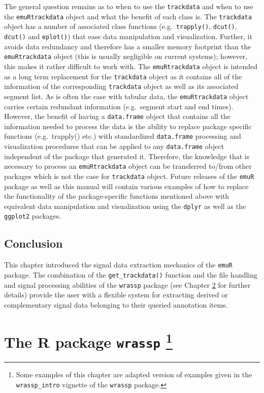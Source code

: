 \documentclass[]{book}
\let\rmarkdownfootnote\footnote%
\def\footnote{\protect\rmarkdownfootnote}
\begin{document}
The general question remains as to when to use the \texttt{trackdata} and when to use the \texttt{emuRtrackdata} object and what the benefit of each class is. The \texttt{trackdata} object has a number of associated class functions (e.g.~\texttt{trapply()}, \texttt{dcut()}, \texttt{dcut()} and \texttt{eplot()}) that ease data manipulation and visualization. Further, it avoids data redundancy and therefore has a smaller memory footprint than the \texttt{emuRtrackdata} object (this is usually negligible on current systems); however, this makes it rather difficult to work with. The \texttt{emuRtrackdata} object is intended as a long term replacement for the \texttt{trackdata} object as it contains all of the information of the corresponding \texttt{trackdata} object as well as its associated segment list. As is often the case with tabular data, the \texttt{emuRtrackdata} object carries certain redundant information (e.g.~segment start and end times). However, the benefit of having a \texttt{data.frame} object that contains all the information needed to process the data is the ability to replace package specific functions (e.g.~trapply() etc.) with standardized \texttt{data.frame} processing and visualization procedures that can be applied to any \texttt{data.frame} object independent of the package that generated it. Therefore, the knowledge that is necessary to process an \texttt{emuRtrackdata} object can be transferred to/from other packages which is not the case for \texttt{trackdata} object. Future releases of the \texttt{emuR} package as well as this manual will contain various examples of how to replace the functionality of the package-specific functions mentioned above with equivalent data manipulation and visualization using the \texttt{dplyr} as well as the \texttt{ggplot2} packages.

\hypertarget{conclusion-3}{%
\section{Conclusion}\label{conclusion-3}}

This chapter introduced the signal data extraction mechanics of the \texttt{emuR} package. The combination of the \texttt{get\_trackdata()} function and the file handling and signal processing abilities of the \texttt{wrassp} package (see Chapter \ref{chap:wrassp} for further details) provide the user with a flexible system for extracting derived or complementary signal data belonging to their queried annotation items.

\hypertarget{chap:wrassp}{%
\chapter[The R package \texttt{wrassp} ]{\texorpdfstring{The R package \texttt{wrassp} \footnote{Some examples of this chapter are adapted version of examples given in the \texttt{wrassp\_intro} vignette of the \texttt{wrassp} package.}}{The R package wrassp }}\label{chap:wrassp}}
\end{document}
